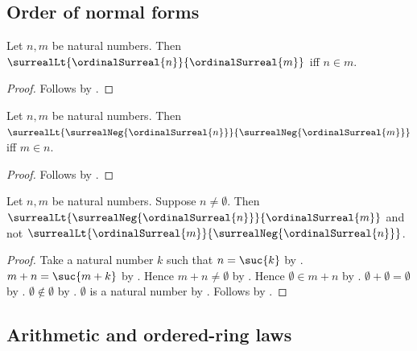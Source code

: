 \subsection{Order of normal forms}

\begin{theorem}\label{surreal_integer_positive_normal_form_order}
    Let $n,m$ be natural numbers.
    Then $\surrealLt{\ordinalSurreal{n}}{\ordinalSurreal{m}}$
        iff $n\in m$.
\end{theorem}
\begin{proof}
    Follows by
        .
\end{proof}

\begin{theorem}\label{surreal_integer_negative_normal_form_order}
    Let $n,m$ be natural numbers.
    Then
        $\surrealLt
            {\surrealNeg{\ordinalSurreal{n}}}
            {\surrealNeg{\ordinalSurreal{m}}}$ iff
        $m\in n$.
\end{theorem}
\begin{proof}
    Follows by
        .
\end{proof}

\begin{theorem}\label{surreal_integer_mixed_normal_form_order}
    Let $n,m$ be natural numbers.
    Suppose $n\neq\emptyset$.
    Then
        $\surrealLt
            {\surrealNeg{\ordinalSurreal{n}}}
            {\ordinalSurreal{m}}$ and
        not $\surrealLt
            {\ordinalSurreal{m}}
            {\surrealNeg{\ordinalSurreal{n}}}$.
\end{theorem}
\begin{proof}
    Take a natural number $k$ such that $n=\suc{k}$
        by .
    $m+n=\suc{m+k}$ by .
    Hence $m+n\neq\emptyset$ by .
    Hence $\emptyset\in m+n$
        by .
    $\emptyset+\emptyset=\emptyset$
        by .
    $\emptyset\notin\emptyset$ by .
    $\emptyset$ is a natural number by .
    Follows by
        .
\end{proof}

\subsection{Arithmetic and ordered-ring laws}

